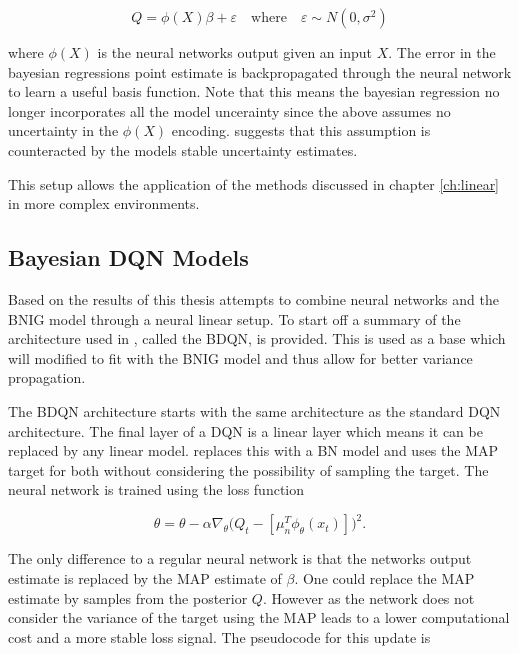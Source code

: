 \begin{equation*}
	Q = \phi(X)\beta + \varepsilon \quad \text{where} \quad \varepsilon \sim N(0,\sigma^2)
\end{equation*}

where $\phi(X)$ is the neural networks output given an input $X$. The error in the bayesian regressions point estimate is backpropagated through the neural network to learn a useful basis function. Note that this means the bayesian regression no longer incorporates all the model uncerainty since the above assumes no uncertainty in the $\phi(X)$ encoding. \cite{carlos_2018} suggests that this assumption is counteracted by the models stable uncertainty estimates.

This setup allows the application of the methods discussed in chapter \ref{ch:linear} in more complex environments.

\subsection{Bayesian DQN Models}

Based on the results of \cite{carlos_2018} this thesis attempts to combine neural networks and the BNIG model through a neural linear setup. To start off a summary of the architecture used in \cite{azziz_2018}, called the BDQN, is provided. This is used as a base which will modified to fit with the BNIG model and thus allow for better variance propagation.

The BDQN architecture starts with the same architecture as the standard DQN architecture\citep{mnih_2015}. The final layer of a DQN is a linear layer which means it can be replaced by any linear model. \cite{azziz_2018} replaces this with a BN model and uses the MAP target for both without considering the possibility of sampling the target. The neural network is trained using the loss function

\begin{equation*}
	\theta = \theta - \alpha\nabla_\theta\big(Q_t - [\mu_n^T\phi_\theta(x_t)]\big)^2.
\end{equation*}

 The only difference to a regular neural network is that the networks output estimate is replaced by the MAP estimate of $\beta$. One could replace the MAP estimate by samples from the posterior $Q$. However as the network does not consider the variance of the target using the MAP leads to a lower computational cost and a more stable loss signal. The pseudocode for this update is

